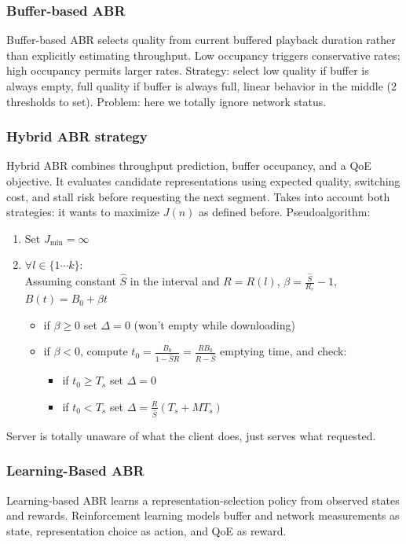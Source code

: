 \subsubsection{Buffer-based ABR}
Buffer-based ABR selects quality from current buffered playback duration rather than explicitly estimating throughput. Low occupancy triggers conservative rates; high occupancy permits larger rates.
Strategy: select low quality if buffer is always empty, full quality if buffer is always full, linear behavior in the middle (2 thresholds to set).
Problem: here we totally ignore network status.
\subsubsection{Hybrid ABR strategy}
Hybrid ABR combines throughput prediction, buffer occupancy, and a QoE objective. It evaluates candidate representations using expected quality, switching cost, and stall risk before requesting the next segment.
Takes into account both strategies: it wants to maximize $J(n)$ as defined before. Pseudoalgorithm:
\begin{enumerate}
    \item Set $J_{\min} = \infty$
    \item $\forall l \in \{1\cdots k\}$:\\
    Assuming constant $\hat{S}$ in the interval and $R = R(l)$, $\beta = \frac{\hat{S}}{R_c} -1$, $B(t) = B_0 + \beta t$
    \begin{itemize}
        \item if $\beta \geq 0$ set $\Delta = 0$ (won't empty while downloading)
        \item if $\beta < 0$, compute $t_0 = \frac{B_0}{1 - \hat{S}{R}} = \frac{RB_0}{R - \hat{S}}$ emptying time, and check:
        \begin{itemize}
            \item if $t_0 \geq T_s$ set $\Delta = 0$
            \item if $t_0 < T_s$ set $\Delta = \frac{R}{\hat{S}}\left(T_s + MT_s\right)$
        \end{itemize}
    \end{itemize}
\end{enumerate}
Server is totally unaware of what the client does, just serves what requested.
\subsubsection{Learning-Based ABR}
Learning-based ABR learns a representation-selection policy from observed states and rewards. Reinforcement learning models buffer and network measurements as state, representation choice as action, and QoE as reward.

